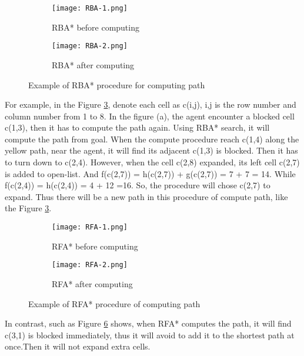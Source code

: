 \begin{figure}
  \centering
  \begin{subfigure}[b]{0.45\textwidth}
    \texttt{[image: RBA-1.png]}
    \caption{RBA* before computing}
    \label{fig:p3-rba-1}
  \end{subfigure}
  \begin{subfigure}[b]{0.45\textwidth}
    \texttt{[image: RBA-2.png]}
    \caption{RBA*  after computing}
    \label{fig:p3-rba-2}
  \end{subfigure}
  \caption{Example of RBA* procedure for computing path}
  \label{fig:p3-rba}
\end{figure}

For example, in the Figure \ref{fig:p3-rba}, denote each cell as c(i,j), i,j
is the row number and column number from 1 to 8. In the figure (a), the agent
encounter a blocked cell c(1,3), then it has to compute the path again. Using
RBA* search, it will compute the path from goal. When the compute procedure
reach c(1,4) along the yellow path,  near the agent, it will find its adjacent
c(1,3) is blocked. Then it has to turn down to c(2,4). However, when the cell
c(2,8) expanded, its left cell c(2,7) is added to open-list. And f(c(2,7)) =
h(c(2,7)) + g(c(2,7)) = 7 + 7 = 14. While f(c(2,4)) = h(c(2,4)) = 4 + 12 =16.
So, the procedure will chose c(2,7) to expand. Thus there will be a new path in
this procedure of compute path, like the Figure \ref{fig:p3-rba}.

\begin{figure}
  \centering
  \begin{subfigure}[b]{0.45\textwidth}
    \texttt{[image: RFA-1.png]}
    \caption{RFA* before computing}
    \label{fig:p3-rfa-1}
  \end{subfigure}
  \begin{subfigure}[b]{0.45\textwidth}
    \texttt{[image: RFA-2.png]}
    \caption{RFA* after computing}
    \label{fig:p3-rfa-2}
  \end{subfigure}
  \caption{Example of RFA* procedure of computing path}
  \label{fig:p3-rfa}
\end{figure}

In contrast, such as Figure \ref{fig:p3-rfa} shows, when RFA* computes the path,
it will find c(3,1) is blocked immediately, thus it will avoid to add it to the
shortest path at once.Then it will not expand extra cells.

